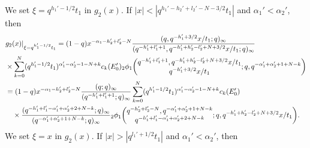 \documentclass[12pt]{amsart}
\numberwithin{equation}{section}
\theoremstyle{definition}
\theoremstyle{remark}
\begin{document}
We set $\xi = q^{h_{1}' - 1/2}t_{1}$ in $g_2 (x)$.
If $|x| < | q^{ h_{1}' - h_{2}' + l_{2}' - N - 3/2}t_{1}|  $ and $\alpha_{1}' < \alpha_{2}' $, then
 \begin{align}
 & g_{2}(x) | _{\xi = q^{h_{1}' - 1/2}t_{1} } = (1 - q) x^{-\alpha_{1} -h_{2}' + l_{2}' - N} \frac{(q, q^{-h_{1}' + 3/2}x/t_{1}; q)_{\infty}}{(q^{-h_{1}' + l_{1}' + 1}, q^{- h_{1}' + h_{2}' - l_{2}' + N + 3/2}x/t_{1}; q)_\infty}  \\
    & \times \sum_{k = 0}^{N} (q^{h_{1}' - 1/2}t_{1})^{\alpha_{1}' - \alpha_{2}' - 1 - N + k} c_{k} (E'_0 ) {}_2\phi_1 \biggl( \begin{array}{@{}c@{}} q^{-h_{1}' + l_{1}' + 1}, q^{- h_{1}' + h_{2}' - l_{2}' + N + 3/2}x/t_{1} \\
q^{-h_{1}' + 3/2}x/t_{1} \end{array} ;q,q^{-\alpha_{1}' + \alpha_{2}' + 1 + N - k} \biggr) \notag \\
    &= (1 - q) x^{-\alpha_{1} -h_{2}' + l_{2}' - N} \frac{(q; q)_{\infty}}{(q^{-h_{1}' + l_{1}' + 1}; q)_\infty}  \sum_{k = 0}^{N} (q^{h_{1}' - 1/2}t_{1})^{\alpha_{1}' - \alpha_{2}' - 1 - N + k} c_{k} (E'_0 )  \notag \\
    & \quad \times \frac{(q^{-h_{1}' + l_{1}' -\alpha_{1}' + \alpha_{2}' + 2 + N - k}; q)_{\infty}}{(q^{-\alpha_{1}' + \alpha_{2}' + 1 + N - k}; q)_{\infty}} {}_2\phi_1 \biggl( \begin{array}{@{}c@{}} q^{- h_{2}' + l_{2}' - N}, q^{-\alpha_{1}' + \alpha_{2}' + 1 + N - k} \\
q^{-h_{1}' + l_{1}' -\alpha_{1}' + \alpha_{2}' + 2 + N - k} \end{array} ;q,q^{- h_{1}' + h_{2}' - l_{2}' + N + 3/2}x/t_{1} \biggr) . \notag
  \end{align}
We set $\xi = x$ in $g_2 (x)$.
If $|x| > | q^{l_{1}' + 1/2}t_{1}| $ and $\alpha_{1}' < \alpha_{2}' $, then
\end{document}

